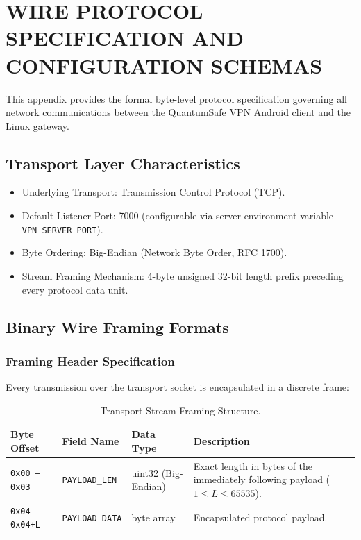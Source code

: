 
\chapter{WIRE PROTOCOL SPECIFICATION AND CONFIGURATION SCHEMAS}
\label{app:wire_protocol}

This appendix provides the formal byte-level protocol specification governing all network communications between the QuantumSafe VPN Android client and the Linux gateway.

\section{Transport Layer Characteristics}
\begin{itemize}
    \item Underlying Transport: Transmission Control Protocol (TCP).
    \item Default Listener Port: 7000 (configurable via server environment variable \texttt{VPN\_}\allowbreak\texttt{SERVER\_}\allowbreak\texttt{PORT}).
    \item Byte Ordering: Big-Endian (Network Byte Order, RFC 1700).
    \item Stream Framing Mechanism: 4-byte unsigned 32-bit length prefix preceding every protocol data unit.
\end{itemize}

\section{Binary Wire Framing Formats}

\subsection{Framing Header Specification}
Every transmission over the transport socket is encapsulated in a discrete frame:
\begin{table}[htbp]
  \centering
  \small
  \setlength{\tabcolsep}{3pt}
  \caption{Transport Stream Framing Structure.}
  \label{tab:stream_framing_struct}
  \begin{tabularx}{\linewidth}{@{}p{2.3cm}p{2.6cm}p{2.6cm}Y@{}}
    \toprule
    \textbf{Byte Offset} & \textbf{Field Name} & \textbf{Data Type} & \textbf{Description} \\
    \midrule
    \texttt{0x00 -- 0x03} & \texttt{PAYLOAD\_LEN} & uint32 (Big-Endian) & Exact length in bytes of the immediately following payload ($1 \le L \le 65535$). \\
    \texttt{0x04 -- 0x04+L} & \texttt{PAYLOAD\_}\allowbreak\texttt{DATA} & byte array & Encapsulated protocol payload. \\
    \bottomrule
  \end{tabularx}
\end{table}

